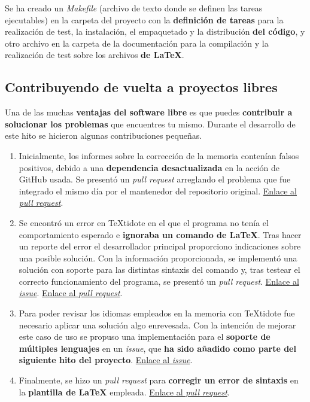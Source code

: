 Se ha creado un \textit{Makefile} (archivo de texto donde se definen las tareas ejecutables)  en la carpeta del proyecto con la \textbf{definición de tareas} para la realización de test, la instalación, el empaquetado y la distribución \textbf{del código}, y otro archivo en la carpeta de la documentación para la compilación y la realización de test sobre los archivos \textbf{de LaTeX}.


\subsection{Contribuyendo de vuelta a proyectos libres}

Una de las muchas \textbf{ventajas del software libre} es que puedes \textbf{contribuir a solucionar los problemas} que encuentres tu mismo. Durante el desarrollo de este hito se hicieron algunas contribuciones pequeñas.

\begin{enumerate}
	\item{Inicialmente, los informes sobre la corrección de la memoria contenían falsos positivos, debido a una \textbf{dependencia desactualizada} en la acción de GitHub usada. Se presentó un \textit{pull request} arreglando el problema que fue integrado el mismo día por el mantenedor del repositorio original. \href{https://github.com/ChiefGokhlayeh/textidote-action/pull/33}{Enlace al \textit{pull request}}.}
	
	\item{Se encontró un error en TeXtidote en el que el programa no tenía el comportamiento esperado e \textbf{ignoraba un comando de LaTeX}. Tras hacer un reporte del error el desarrollador principal proporciono indicaciones sobre una posible solución. Con la información proporcionada, se implementó una solución con soporte para las distintas sintaxis del comando y, tras testear el correcto funcionamiento del programa, se presentó un \textit{pull request}. \href{https://github.com/sylvainhalle/textidote/issues/208}{Enlace al \textit{issue}}. \href{https://github.com/sylvainhalle/textidote/pull/209}{Enlace al \textit{pull request}}.}
	
	\item{Para poder revisar los idiomas empleados en la memoria con TeXtidote fue necesario aplicar una solución algo enrevesada. Con la intención de mejorar este caso de uso se propuso una implementación para el \textbf{soporte de múltiples lenguajes} en un \textit{issue}, que \textbf{ha sido añadido como parte del siguiente hito del proyecto}. \href{https://github.com/sylvainhalle/textidote/issues/203}{Enlace al \textit{issue}}.}
	
	\item{Finalmente, se hizo un \textit{pull request} para \textbf{corregir un error de sintaxis} en la \textbf{plantilla de LaTeX} empleada. \href{https://github.com/JJ/plantilla-TFG-ETSIIT/pull/7}{Enlace al \textit{pull request}}.}
\end{enumerate}

